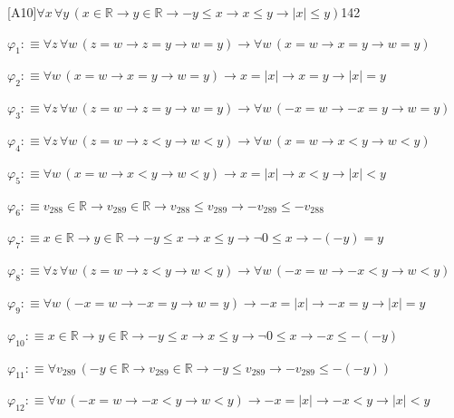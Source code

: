 \begin{fullproof}{[A10]}{$\forall x\,\forall y\,(x \in \mathbb{R} \to y \in \mathbb{R} \to -y \leq x \to x \leq y \to \lvert x \rvert \leq y)$}{142}
\begin{ptree}
\noLine
{}
\end{ptree}
\begin{abbrevlist}
\item $\varphi_{1} :\equiv \forall z\,\forall w\,(z = w \to z = y \to w = y) \to \forall w\,(x = w \to x = y \to w = y)$
\item $\varphi_{2} :\equiv \forall w\,(x = w \to x = y \to w = y) \to x = \lvert x \rvert \to x = y \to \lvert x \rvert = y$
\item $\varphi_{3} :\equiv \forall z\,\forall w\,(z = w \to z = y \to w = y) \to \forall w\,(-x = w \to -x = y \to w = y)$
\item $\varphi_{4} :\equiv \forall z\,\forall w\,(z = w \to z < y \to w < y) \to \forall w\,(x = w \to x < y \to w < y)$
\item $\varphi_{5} :\equiv \forall w\,(x = w \to x < y \to w < y) \to x = \lvert x \rvert \to x < y \to \lvert x \rvert < y$
\item $\varphi_{6} :\equiv v_{288} \in \mathbb{R} \to v_{289} \in \mathbb{R} \to v_{288} \leq v_{289} \to -v_{289} \leq -v_{288}$
\item $\varphi_{7} :\equiv x \in \mathbb{R} \to y \in \mathbb{R} \to -y \leq x \to x \leq y \to \neg 0 \leq x \to -(-y) = y$
\item $\varphi_{8} :\equiv \forall z\,\forall w\,(z = w \to z < y \to w < y) \to \forall w\,(-x = w \to -x < y \to w < y)$
\item $\varphi_{9} :\equiv \forall w\,(-x = w \to -x = y \to w = y) \to -x = \lvert x \rvert \to -x = y \to \lvert x \rvert = y$
\item $\varphi_{10} :\equiv x \in \mathbb{R} \to y \in \mathbb{R} \to -y \leq x \to x \leq y \to \neg 0 \leq x \to -x \leq -(-y)$
\item $\varphi_{11} :\equiv \forall v_{289}\,(-y \in \mathbb{R} \to v_{289} \in \mathbb{R} \to -y \leq v_{289} \to -v_{289} \leq -(-y))$
\item $\varphi_{12} :\equiv \forall w\,(-x = w \to -x < y \to w < y) \to -x = \lvert x \rvert \to -x < y \to \lvert x \rvert < y$

\end{abbrevlist}
\end{fullproof}
